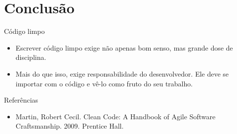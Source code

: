 \documentclass[11pt]{beamer}
\begin{document}
  \section{Conclusão}

  \begin{frame}{Código limpo}
    \begin{itemize}
      \item Escrever código limpo exige não apenas bom senso, mas grande dose de disciplina.
      \item Mais do que isso, exige responsabilidade do desenvolvedor. Ele deve se importar com o código e vê-lo como fruto do seu trabalho.
    \end{itemize}
  \end{frame}

  \begin{frame}{Referências}
    \begin{itemize}
      \item Martin, Robert Cecil. Clean Code: A Handbook of Agile Software Craftsmanship. 2009. Prentice Hall.
    \end{itemize}
  \end{frame}
\end{document}
